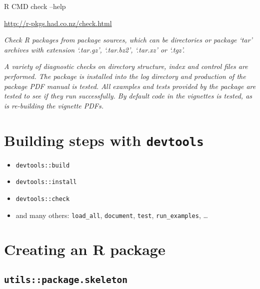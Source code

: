 \documentclass[]{book}
\newenvironment{Shaded}{\begin{snugshade}}{\end{snugshade}}
\newcommand{\NormalTok}[1]{{#1}}
\theoremstyle{definition}
\theoremstyle{definition}
\theoremstyle{definition}
\theoremstyle{remark}
\begin{document}
\begin{Shaded}
\begin{Highlighting}[]
\NormalTok{R CMD check --help}
\end{Highlighting}
\end{Shaded}

\url{http://r-pkgs.had.co.nz/check.html}

\emph{Check R packages from package sources, which can be directories or
package `tar' archives with extension `.tar.gz', `.tar.bz2', `.tar.xz'
or `.tgz'.}

\emph{A variety of diagnostic checks on directory structure, index and
control files are performed. The package is installed into the log
directory and production of the package PDF manual is tested. All
examples and tests provided by the package are tested to see if they run
successfully. By default code in the vignettes is tested, as is
re-building the vignette PDFs.}

\section{\texorpdfstring{Building steps with
\texttt{devtools}}{Building steps with devtools}}\label{building-steps-with-devtools}

\begin{itemize}
\item
  \texttt{devtools::build}
\item
  \texttt{devtools::install}
\item
  \texttt{devtools::check}
\item
  and many others: \texttt{load\_all}, \texttt{document}, \texttt{test},
  \texttt{run\_examples}, \ldots{}
\end{itemize}

\section{Creating an R package}\label{creating-an-r-package}

\subsection{\texorpdfstring{\texttt{utils::package.skeleton}}{utils::package.skeleton}}\label{utilspackage.skeleton}
\end{document}

